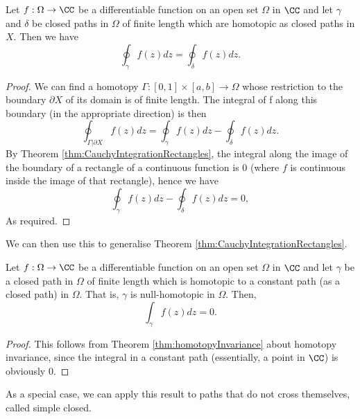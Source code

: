 \begin{theorem}
   Let $f:\Omega\to\CC$ be a differentiable function on an open set $\Omega$ in $\CC$ and
   let $\gamma$ and $\delta$ be closed paths in $\Omega$ of finite length which
   are homotopic as closed paths in $X$. Then we have
   \[\oint_{\gamma} f(z)dz = \oint_{\delta} f(z)dz.\]
  \label{thm:homotopyInvariance}
\end{theorem}
\begin{proof}
  We can find a homotopy $\Gamma: [0,1]\times [a,b]\to\Omega$ whose restriction
  to the boundary $\partial X$ of its domain is of finite length. The integral of f along
  this boundary (in the appropriate direction) is then
  \[\oint_{\Gamma|\partial X}f(z)dz = \oint_{\gamma}f(z)dz -
  \oint_{\delta}f(z)dz.\]
  By Theorem \ref{thm:CauchyIntegrationRectangles}, the integral along the image
  of the boundary of a rectangle of a continuous function is $0$ (where $f$ is
  continuous inside the image of that rectangle), hence we have
  \[\oint_{\gamma}f(z)dz - \oint_{\delta}f(z)dz = 0,\]
  As required.
\end{proof}
We can then use this to generalise Theorem
\ref{thm:CauchyIntegrationRectangles}. 
\begin{theorem}
  Let $f:\Omega\to\CC$ be a differentiable function on an open set $\Omega$ in $\CC$ and
  let $\gamma$ be a closed path in $\Omega$ of finite length which is homotopic to a
  constant path (as a closed path) in $\Omega$. That is, $\gamma$ is
  null-homotopic in $\Omega$. Then,
  \[\int_{\gamma} f(z)dz =0.\]
  \label{thm:CauchyNullHomotopic}
\end{theorem}
\begin{proof}
  This follows from Theorem \ref{thm:homotopyInvariance} about homotopy
  invariance, since the integral in a constant path (essentially, a point in
  $\CC$) is obviously $0$.
\end{proof}
As a special case, we can apply this result to paths that do not cross
themselves, called simple closed.


















